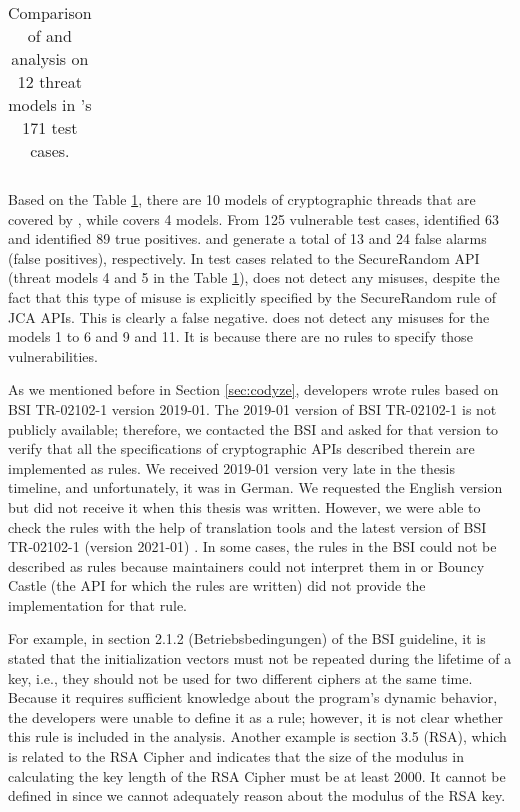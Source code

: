 \begin{table}[hp]
\begin{adjustwidth}{-1em}{}
\begin{tabular}{|c|l|c|c|c|c|}
\end{tabular}
\caption{\label{tab:cryptobench} Comparison of \codyze{} and \cognicryptsast{} analysis on 12 threat models in \cryptoapibench{}'s 171 test cases.}
\end{adjustwidth}
\end{table}

Based on the Table \ref{tab:cryptobench}, there are 10 models of cryptographic threads that are covered by \cognicryptsast, while \codyze{} covers 4 models. From 125 vulnerable test cases, \codyze{} identified 63 and \cognicryptsast{} identified 89 true positives. \codyze{} and \cognicryptsast{} generate a total of 13 and 24 false alarms (false positives), respectively. In test cases related to the SecureRandom API (threat models 4 and 5 in the Table \ref{tab:cryptobench}), \cognicryptsast{} does not detect any misuses, despite the fact that this type of misuse is explicitly specified by the SecureRandom \crysl{} rule of JCA APIs. This is clearly a false negative. \codyze{} does not detect any misuses for the models 1 to 6 and 9 and 11. It is because there are no \MARK{} rules to specify those vulnerabilities. 

As we mentioned before in Section \ref{sec:codyze}, \MARK{} developers wrote \MARK{} rules based on BSI \cite{BSI} TR-02102-1 version 2019-01. The 2019-01 version of BSI TR-02102-1 is not publicly available; therefore, we contacted the BSI and asked for that version to verify that all the specifications of cryptographic APIs described therein are implemented as \MARK{} rules. We received 2019-01 version \cite{bsi19} very late in the thesis timeline, and unfortunately, it was in German. We requested the English version but did not receive it when this thesis was written. However, we were able to check the rules with the help of translation tools and the latest version of BSI TR-02102-1 (version 2021-01) \cite{bsiTR}.  In some cases, the rules in the BSI could not be described as \MARK{} rules because \MARK{} maintainers could not interpret them in \MARK{} or Bouncy Castle (the API for which the \MARK{} rules are written) did not provide the implementation for that rule.

For example, in section 2.1.2 (Betriebsbedingungen) of the BSI guideline, it is stated that the initialization vectors must not be repeated during the lifetime of a key, i.e., they should not be used for two different ciphers at the same time. Because it requires sufficient knowledge about the program's dynamic behavior, the \MARK{} developers were unable to define it as a \MARK{} rule; however, it is not clear whether this rule is included in the analysis. Another example is section 3.5 (RSA), which is related to the RSA Cipher and indicates that the size of the modulus in calculating the key length of the RSA Cipher must be at least 2000. It cannot be defined in \MARK{} since we cannot adequately reason about the modulus of the RSA key.


